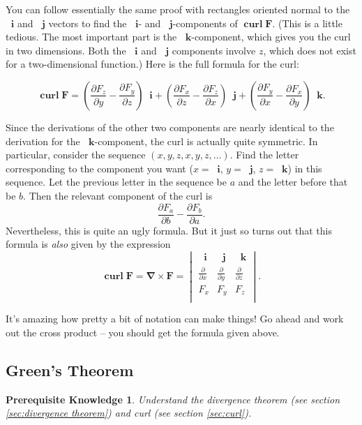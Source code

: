 \documentclass{myarticle}
\DeclareMathOperator{\curl}{\mathbf{curl}}
\renewcommand{\vec}[1]{\mathbf{#1}}
\newcommand{\unitvector}[1]{
  \mathop{}\!\vec{#1}
}
\newcommand{\ih}{\unitvector{i}}
\newcommand{\jh}{\unitvector{j}}
\newcommand{\kh}{\unitvector{k}}
\newcommand{\del}{\boldsymbol{\nabla}}
\theoremstyle{nospace}
\newtheorem*{oldprereq}{Prerequisite Knowledge}
\newenvironment{prereq}
{\begin{mdframed}\begin{oldprereq}}
    {\end{oldprereq}\end{mdframed}}
\newtheorem{old series theorem}{Theorem}
\newenvironment{series theorem}
{\begin{mdframed}\begin{old series theorem}}
    {\end{old series theorem}\end{mdframed}}
\begin{document}
You can follow essentially the same proof with rectangles oriented
normal to the $\ih$ and $\jh$ vectors to find the $\ih$- and
$\jh$-components of $\curl \vec{F}$. (This is a little tedious. The
most important part is the $\kh$-component, which gives you the curl
in two dimensions. Both the $\ih$ and $\jh$ components involve $z$,
which does not exist for a two-dimensional function.) Here is the full
formula for the curl:

\[
  \curl \vec{F}
  = \left(\frac{\partial F_z}{\partial y}
    - \frac{\partial F_y}{\partial z}\right) \ih
  + \left(\frac{\partial F_x}{\partial z}
    - \frac{\partial F_z}{\partial x}\right) \jh
  + \left(\frac{\partial F_y}{\partial x}
    - \frac{\partial F_x}{\partial y}\right) \kh.
\]

Since the derivations of the other two components are nearly identical
to the derivation for the $\kh$-component, the curl is actually quite
symmetric. In particular, consider the sequence
$(x, y, z, x, y, z, \dots)$. Find the letter corresponding to the
component you want ($x = \ih$, $y = \jh$, $z = \kh$) in this sequence.
Let the previous letter in the sequence be $a$ and the letter before
that be $b$. Then the relevant component of the curl is
\[
  \frac{\partial F_a}{\partial b} - \frac{\partial F_b}{\partial a}.
\]
Nevertheless, this is quite an ugly formula. But it just so turns out
that this formula is \textit{also} given by the expression
\[
  \curl \vec{F} = \del \times \vec{F} = \begin{vmatrix}
    \ih & \jh & \kh \\
    \frac{\partial}{\partial x} &
    \frac{\partial}{\partial y} &
    \frac{\partial}{\partial z} \\
    F_x & F_y & F_z \\
  \end{vmatrix}.
\]

It's amazing how pretty a bit of notation can make things! Go ahead
and work out the cross product -- you should get the formula given
above.

\subsection{Green's Theorem}
\label{sec:greens theorem}

\begin{prereq}
  Understand the divergence theorem (see section \ref{sec:divergence
    theorem}) and curl (see section \ref{sec:curl}).
\end{prereq}
\end{document}
